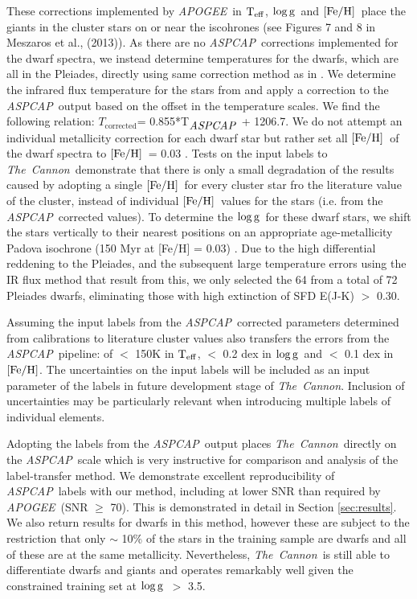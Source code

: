 \documentclass[12pt, preprint]{aastex}
\newcommand{\teff}{\mbox{$\rm T_{eff}$}}
\newcommand{\feh}{\mbox{$\rm [Fe/H]$}}
\newcommand{\logg}{\mbox{$\rm \log g$}}
\newcommand{\tc}{\textsl{The~Cannon}}
\newcommand{\apogee}{\textsl{APOGEE}}
\newcommand{\aspcap}{\textsl{ASPCAP}}
\begin{document}
These corrections implemented by \apogee\ in \teff, \logg\ and  \feh\ place the giants in the cluster stars on or near the iscohrones (see Figures 7 and 8 in Meszaros et al., (2013)).  As there are no \aspcap\ corrections implemented for the dwarf spectra, we instead determine temperatures for the dwarfs, which are all in the Pleiades, directly using same correction method as in \citet{Meszaros2013}. We determine the infrared flux temperature for the stars from \citep{Gonzalez2009} and apply a correction to the \aspcap\ output based on the offset in the temperature scales. We find the following relation: $T_{\mbox{corrected}}$= 0.855*T$_{\mbox{\textit{ASPCAP}}}$ + 1206.7. We do not attempt an individual metallicity correction for each dwarf star but rather set all \feh\ of the dwarf spectra to \feh\ = 0.03 \citep{Barrado2001}. Tests on the input labels to \tc\ demonstrate that there is only a small degradation of the results caused by adopting a single \feh\ for every cluster star fro the literature value of the cluster, instead of individual \feh\ values for the stars (i.e. from the \aspcap\ corrected values). To determine the \logg\ for these dwarf stars, we shift the stars vertically to their nearest positions on an appropriate age-metallicity Padova isochrone (150 Myr at [Fe/H] = 0.03) \citep{girardi2000}. Due to the high differential reddening to the Pleiades, and the subsequent large temperature errors using the IR flux method that result from this, we only selected the 64 from a total of 72 Pleiades dwarfs, eliminating those with high extinction of SFD E(J-K) $>$ 0.30.

Assuming the input labels from the \aspcap\ corrected parameters determined from calibrations to literature cluster values also transfers the errors from the \aspcap\ pipeline: of $<$ 150K in \teff,  $<$ 0.2 dex in \logg\ and $<$ 0.1 dex in \feh.   The uncertainties on the input labels will be included as an input parameter of the labels in future development stage of \tc. Inclusion of uncertainties may be particularly relevant when introducing multiple labels of individual elements. 

Adopting the labels from the \aspcap\ output places \tc\ directly on the \aspcap\ scale which is very instructive for comparison and analysis of the label-transfer method. We demonstrate excellent reproducibility of \aspcap\ labels with our method, including at lower SNR than required by \apogee\ (SNR $\ge$ 70). This is demonstrated in detail in Section \ref{sec:results}. We also return results for dwarfs in this method, however these are subject to the restriction that only $\sim$ 10\% of the stars in the training sample are dwarfs and all of these are at the same metallicity. Nevertheless, \tc\ is still able to differentiate dwarfs and giants and operates remarkably well given the constrained training set at \logg\ $>$ 3.5. 
\end{document}

